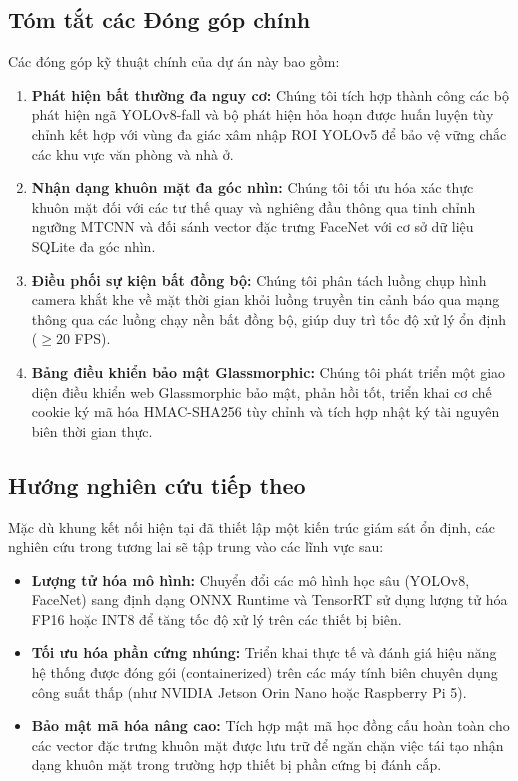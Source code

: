 \documentclass[12pt,a4paper]{article}
\begin{document}
\subsection{Tóm tắt các Đóng góp chính}
Các đóng góp kỹ thuật chính của dự án này bao gồm:
\begin{enumerate}
    \item \textbf{Phát hiện bất thường đa nguy cơ:} Chúng tôi tích hợp thành công các bộ phát hiện ngã YOLOv8-fall và bộ phát hiện hỏa hoạn được huấn luyện tùy chỉnh kết hợp với vùng đa giác xâm nhập ROI YOLOv5 để bảo vệ vững chắc các khu vực văn phòng và nhà ở.
    \item \textbf{Nhận dạng khuôn mặt đa góc nhìn:} Chúng tôi tối ưu hóa xác thực khuôn mặt đối với các tư thế quay và nghiêng đầu thông qua tinh chỉnh ngưỡng MTCNN và đối sánh vector đặc trưng FaceNet với cơ sở dữ liệu SQLite đa góc nhìn.
    \item \textbf{Điều phối sự kiện bất đồng bộ:} Chúng tôi phân tách luồng chụp hình camera khắt khe về mặt thời gian khỏi luồng truyền tin cảnh báo qua mạng thông qua các luồng chạy nền bất đồng bộ, giúp duy trì tốc độ xử lý ổn định ($\ge 20$ FPS).
    \item \textbf{Bảng điều khiển bảo mật Glassmorphic:} Chúng tôi phát triển một giao diện điều khiển web Glassmorphic bảo mật, phản hồi tốt, triển khai cơ chế cookie ký mã hóa HMAC-SHA256 tùy chỉnh và tích hợp nhật ký tài nguyên biên thời gian thực.
\end{enumerate}

\subsection{Hướng nghiên cứu tiếp theo}
Mặc dù khung kết nối hiện tại đã thiết lập một kiến trúc giám sát ổn định, các nghiên cứu trong tương lai sẽ tập trung vào các lĩnh vực sau:
\begin{itemize}
    \item \textbf{Lượng tử hóa mô hình:} Chuyển đổi các mô hình học sâu (YOLOv8, FaceNet) sang định dạng ONNX Runtime và TensorRT sử dụng lượng tử hóa FP16 hoặc INT8 để tăng tốc độ xử lý trên các thiết bị biên.
    \item \textbf{Tối ưu hóa phần cứng nhúng:} Triển khai thực tế và đánh giá hiệu năng hệ thống được đóng gói (containerized) trên các máy tính biên chuyên dụng công suất thấp (như NVIDIA Jetson Orin Nano hoặc Raspberry Pi 5).
    \item \textbf{Bảo mật mã hóa nâng cao:} Tích hợp mật mã học đồng cấu hoàn toàn cho các vector đặc trưng khuôn mặt được lưu trữ để ngăn chặn việc tái tạo nhận dạng khuôn mặt trong trường hợp thiết bị phần cứng bị đánh cắp.
\end{itemize}

\newpage

\printbibliography
\end{document}
